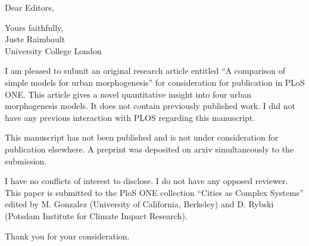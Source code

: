 \documentclass[11pt,a4paper,sans]{moderncv}        %
\begin{document}




\date{September 4th, 2020}
\opening{Dear Editors,}
\closing{Yours faithfully,\\
Juste Raimbault\\
University College London
}
\makelettertitle

\justify
I am pleased to submit an original research article entitled ``A comparison of simple models for urban morphogenesis'' for consideration for publication in PLoS ONE. This article gives a novel quantitative insight into four urban morphogenesis models. It does not contain previously published work. I did not have any previous interaction with PLOS regarding this manuscript.

This manuscript has not been published and is not under consideration for publication elsewhere. A preprint was deposited on arxiv simultaneously to the submission.

I have no conflicts of interest to disclose. I do not have any opposed reviewer. This paper is submitted to the PloS ONE collection ``Cities as Complex Systems'' edited by M. Gonzalez (University of California, Berkeley) and D. Rybski (Potsdam Institute for Climate Impact Research).


Thank you for your consideration.
\justify




\makeletterclosing
\end{document}
